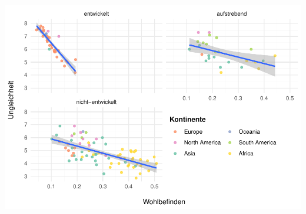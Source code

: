 \documentclass[
]{article}
\begin{document}
\includegraphics{ggplot2_files/figure-latex/unnamed-chunk-8-1.pdf}
\end{document}
